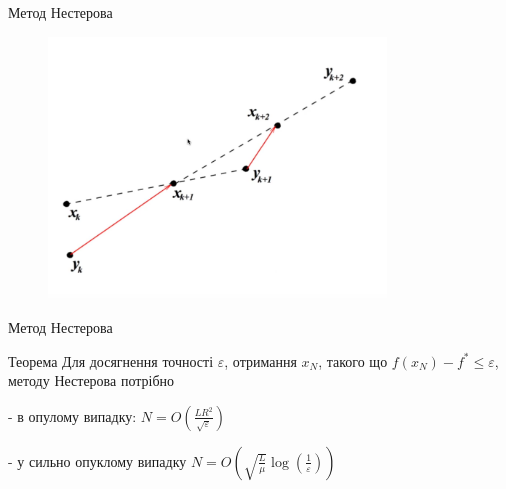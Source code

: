 \documentclass[a4paper, 14pt]{beamer}
\begin{document}
\begin{frame}{Метод Нестерова}
    \begin{figure}
        \includegraphics[width = 0.8\textwidth]{imgs/nesterov2.png}
    \end{figure}
\end{frame}

\begin{frame}{Метод Нестерова}
    \begin{theo}{Теорема}
        Для досягнення точності $\varepsilon$, отримання 
        $x_N$, такого що $f\left(x_N\right)-f^* \leq \varepsilon$, 
        методу Нестерова потрібно
        
        
        - в опулому випадку: 
        $N=O\left(\frac{L R^2}{\sqrt{\varepsilon}}\right)$


        - у сильно опуклому випадку 
        $N=O\left(\sqrt{\frac{L}{\mu}} \log 
        \left(\frac{1}{\varepsilon}\right)\right)$ 
    \end{theo}
\end{frame}
\end{document}
